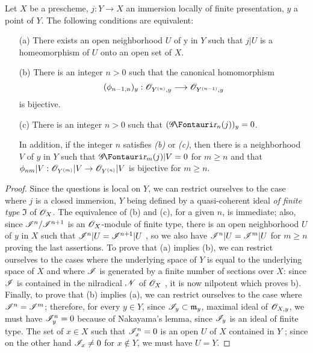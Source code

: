 \begin{proposition}[16.1.9]
\label{IV.16.1.9}
Let $X$ be a prescheme, $j: Y \to X$ an immersion locally of finite presentation, $y$ a point of $Y$. The following conditions are equivalent:
\begin{enumerate}
  \item[(a)] There exists an open neighborhood $U$ of y in $Y$ such that $j|U$ is a homeomorphism of $U$ onto an open set of $X$.
  \item[(b)] There is an integer $n>0$ such that the canonical homomorphism
  \[
    (\vphi_{n-1,n})_y: \sh{O}_{Y^{(n)},y} \to \sh{O}_{Y^{(n-1)},y}
  \]
  is bijective.
  \item[(c)] There is an integer $n>0$ such that $(\shGr_n(j))_y = 0$.
  
  In addition, if the integer $n$ satisfies \emph{(b)} or \emph{(c)}, then there is a neighborhood $V$ of $y$ in $Y$ such that $\shGr_m(j)|V = 0$ for $m \geq n$ and that $\vphi_{nm}|V: \sh{O}_{Y^{(m)}}|V \to \sh{O}_{Y^{(n)}}|V$ is bijective for $m \geq n$. 
\end{enumerate}
\end{proposition}

\begin{proof}
Since the questions is local on $Y$, we can restrict ourselves to the case where $j$ is a closed immersion, $Y$ being defined by a quasi-coherent ideal \emph{of finite type} $\mathfrak{I}$ of $\mathscr{O}_X$.
The equivalence of (b) and (c), for a given $n$, is immediate;
also, since $\mathscr{I}^n/\mathscr{I}^{n+1}$ is an $\mathscr{O}_X$-module of finite type, there is an open neighborhood $U$ of $y$ in $X$ such that $\mathscr{I}^n|U = \mathscr{I}^{n+1}|U$ , so we also have $\mathscr{I}^n|U = \mathscr{I}^m|U$ for $m \geq n$ proving the last assertions.
To prove that (a) implies (b), we can restrict ourselves to the cases where the underlying space of $Y$ is equal to the underlying space of $X$ and where $\mathscr{I}$ is generated by a finite number of sections over $X$:
since $\mathscr{I}$ is contained in the nilradical $\mathscr{N}$ of $\mathscr{O}_X$ , it is now nilpotent which proves b).
Finally, to prove that (b) implies (a), we can restrict ourselves to the case where $\mathscr{I}^n = \mathscr{I}^m$; 
therefore, for every $y \in Y$, since $\mathscr{I}_y \subset \mathfrak{m}_y$, maximal ideal of $\mathscr{O}_{X,y}$, we must have $\mathscr{I}^n_y = 0$ because of Nakayama's lemma, since $\mathscr{I}_y$ is an ideal of finite type.
The set of $x \in X$ such that $\mathscr{I}^n_x = 0$ is an open $U$ of $X$ contained in $Y$ ;
since on the other hand $\mathscr{I}_x \neq 0$ for $x \notin Y$, we must have $U = Y$.
\end{proof}

